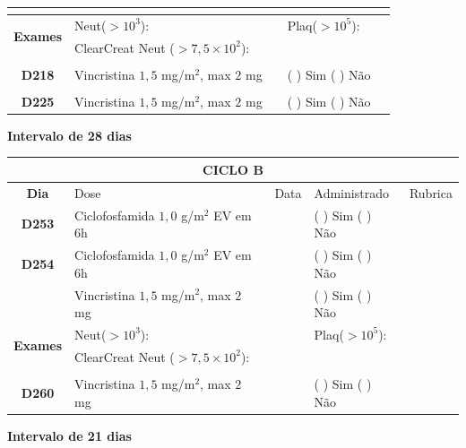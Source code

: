 \documentclass[11pt,a4paper,oldfontcommands]{memoir}
\begin{document}
\begin{center}
\begin{longtable}{p{1cm}p{6cm}|p{1cm}|p{3cm}|p{2.5cm}}
    \multicolumn{1}{c|}{\multirow{1}{*}{\textbf{}}}&&&&\\
    \hline
    \multicolumn{1}{c|}{\multirow{2}{*}{\textbf{Exames}}}&\multicolumn{2}{l|}{Neut(\(>10^3\)):}&{Plaq(\(>10^5\)):}&\\
    \cline{2-5}
    \multicolumn{1}{c|}{\multirow{2}{*}{{}}}&\multicolumn{2}{l|}{ClearCreat Neut (\(>7,5\times10^2\)):}&{}&{}\\
    \hline
    \\
    \hline
    \multicolumn{1}{c|}{\multirow{1}{*}{\textbf{D218}}}&{Vincristina \(1,5\) mg/m\(^2\), max \(2\) mg}&&{(  ) Sim (  ) Não}&\\
    \hline
    \\
    \hline
    \multicolumn{1}{c|}{\multirow{1}{*}{\textbf{D225}}}&{Vincristina \(1,5\) mg/m\(^2\), max \(2\) mg}&&{(  ) Sim (  ) Não}&\\
    \hline
    \end{longtable}
    \textbf{Intervalo de 28 dias}
    \begin{longtable}{p{1cm}p{6cm}|p{1cm}|p{3cm}|p{2.5cm}}
    \hline
	\multicolumn{5}{c}{\textbf{CICLO B}}\\
	\hline
    \multicolumn{1}{c|}{\multirow{1}{*}{\textbf{Dia}}}&{Dose}&{Data}&{Administrado}&{Rubrica} \\
    \hline
    \multicolumn{1}{c|}{\multirow{1}{*}{\textbf{D253}}}&{Ciclofosfamida \(1,0\) g/m\(^2\) EV em 6h}&&{(  ) Sim (  ) Não}&\\
    \multicolumn{1}{c|}{\multirow{1}{*}{\textbf{D254}}}&{Ciclofosfamida \(1,0\) g/m\(^2\) EV em 6h}&&{(  ) Sim (  ) Não}&\\
    \multicolumn{1}{c|}{\multirow{1}{*}{\textbf{}}}&{Vincristina \(1,5\) mg/m\(^2\), max \(2\) mg}&&{(  ) Sim (  ) Não}&\\
    \hline
    \multicolumn{1}{c|}{\multirow{2}{*}{\textbf{Exames}}}&\multicolumn{2}{l|}{Neut(\(>10^3\)):}&{Plaq(\(>10^5\)):}&\\
    \cline{2-5}
    \multicolumn{1}{c|}{\multirow{2}{*}{{}}}&\multicolumn{2}{l|}{ClearCreat Neut (\(>7,5\times10^2\)):}&{}&{}\\
    \hline
    \\
    \hline
    \multicolumn{1}{c|}{\multirow{1}{*}{\textbf{D260}}}&{Vincristina \(1,5\) mg/m\(^2\), max \(2\) mg}&&{(  ) Sim (  ) Não}&\\
    \hline
\end{longtable}
\textbf{Intervalo de 21 dias}
\clearpage
\begin{longtable}{p{1cm}p{6cm}|p{1cm}|p{3cm}|p{2.5cm}}

\end{longtable}
\end{center}
\end{document}
